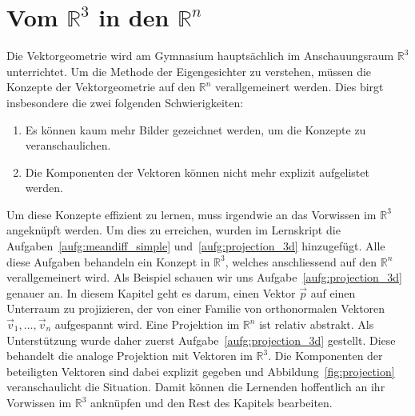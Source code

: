 \section{Vom $\mathbb R^3$ in den $\mathbb R^n$}
Die Vektorgeometrie wird am Gymnasium hauptsächlich im Anschauungsraum $\mathbb R^3$ unterrichtet.
Um die Methode der Eigengesichter zu verstehen, müssen die Konzepte der Vektorgeometrie auf den $\mathbb R^n$ verallgemeinert werden.
Dies birgt insbesondere die zwei folgenden Schwierigkeiten:
\begin{enumerate}[label=\arabic*.]
	\item Es können kaum mehr Bilder gezeichnet werden, um die Konzepte zu veranschaulichen.
	\item Die Komponenten der Vektoren können nicht mehr explizit aufgelistet werden.
\end{enumerate}
Um diese Konzepte effizient zu lernen, muss irgendwie an das Vorwissen im $\mathbb R^3$ angeknüpft werden.
Um dies zu erreichen, wurden im Lernskript die Aufgaben~\ref{aufg:meandiff_simple} und~\ref{aufg:projection_3d} hinzugefügt.
Alle diese Aufgaben behandeln ein Konzept in $\mathbb R^3$, welches anschliessend auf den $\mathbb R^n$ verallgemeinert wird.
Als Beispiel schauen wir uns Aufgabe~\ref{aufg:projection_3d} genauer an.
In diesem Kapitel geht es darum, einen Vektor $\vec{p}$ auf einen Unterraum zu projizieren, der von einer Familie von orthonormalen Vektoren $\vec{v}_1,\ldots,\vec{v}_n$ aufgespannt wird.
Eine Projektion im $\mathbb R^n$ ist relativ abstrakt.
Als Unterstützung wurde daher zuerst Aufgabe~\ref{aufg:projection_3d} gestellt.
Diese behandelt die analoge Projektion mit Vektoren im $\mathbb R^3$.
Die Komponenten der beteiligten Vektoren sind dabei explizit gegeben und Abbildung~\ref{fig:projection} veranschaulicht die Situation.
Damit können die Lernenden hoffentlich an ihr Vorwissen im $\mathbb R^3$ anknüpfen und den Rest des Kapitels bearbeiten.
